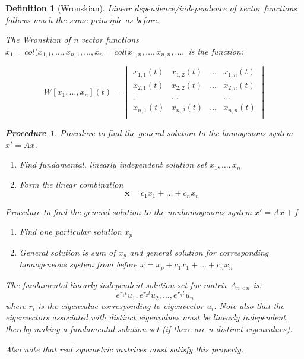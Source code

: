 \documentclass[12pt]{report}
\newtheorem{dfn}{Definition}
\newtheorem{proc}{Procedure}
\newcommand{\mtx}[3]{$#1_{#2\times #3}$}
\begin{document}
\begin{dfn}[Wronskian]
Linear dependence/independence of vector functions follows much the same principle as before.

The Wronskian of n vector functions $x_1=col(x_{1,1},\ldots, x_{n,1},\ldots,x_n=col(x_{1,n},\ldots, x_{n,n},\ldots,$ is the function:

\begin{equation}
W[x_1,\ldots,x_n](t)=
\begin{vmatrix}
x_{1,1}(t) & x_{1,2}(t) & \ldots & x_{1,n}(t) \\
x_{2,1}(t) & x_{2,2}(t) & \ldots & x_{2,n}(t) \\
\vdots & \ldots & & \ldots \\
x_{n,1}(t) & x_{n,2}(t) & \ldots & x_{n,n}(t) \\
\end{vmatrix}
\end{equation}

\begin{proc}
Procedure to find the general solution to the homogenous system $x'=Ax$.
\begin{enumerate}
\item Find fundamental, linearly independent solution set ${x_1, \ldots, x_n}$
\item Form the linear combination
\begin{equation}
\mathbf{x}=c_1x_1+\ldots+c_nx_n
\end{equation}
\end{enumerate}

Procedure to find the general solution to the nonhomogenous system $x'=Ax+f$
\begin{enumerate}
\item Find one particular solution $x_p$
\item General solution is sum of $x_p$ and general solution for corresponding homogeneous system from before
$x=x_p+c_1x_1+\ldots+c_nx_n$
\end{enumerate}
\end{proc}

The fundamental linearly independent solution set for matrix \mtx{A}{n}{n} is:
\begin{equation}
{e^{r_1t}u_1, e^{r_2t}u_2,\ldots, e^{r_nt}u_n}
\end{equation}
where $r_i$ is the eigenvalue corresponding to eigenvector $u_i$. Note also that the eigenvectors associated with distinct eigenvalues must be linearly independent, thereby making a fundamental solution set (if there are n distinct eigenvalues).

Also note that real symmetric matrices must satisfy this property.

\end{dfn}
\end{document}
